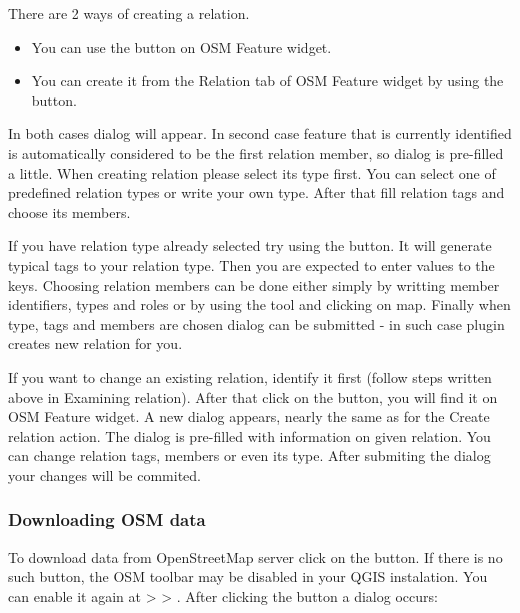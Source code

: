 
There are 2 ways of creating a relation. 

\begin{itemize}
\item You can use the  
button on OSM Feature widget.
\item You can create it from the Relation tab of OSM Feature widget by 
using the  button.   
\end{itemize}

In both cases dialog will appear. In second case feature that is currently
identified is automatically considered to be the first relation member, so
dialog is pre-filled a little. When creating relation please select its 
type first. You can select one of predefined relation types or write your 
own type. After that fill relation tags and choose its members.

If you have relation type already selected try using the 
 button. It will 
generate typical tags to your relation type. Then you are expected to 
enter values to the keys. Choosing relation members can 
be done either simply by writting member identifiers, types and roles or 
by using the  tool and clicking on map.
Finally when type, tags and members are chosen dialog can be submitted - in
such case plugin creates new relation for you.


If you want to change an existing relation, identify it first (follow steps
written above in Examining relation). After that click on the 
 button, you will find it 
on OSM Feature widget. A new dialog appears, nearly the same as for the 
Create relation action. The dialog is pre-filled with information on 
given relation. You can change relation tags, members or even its type. 
After submiting the dialog your changes will be commited.

\subsubsection{Downloading OSM data}  

To download data from OpenStreetMap server click on the 
 button. If there is no 
such button, the OSM toolbar may be disabled in your QGIS instalation.
You can enable it again at  > 
 > . After clicking the 
button a dialog occurs:

